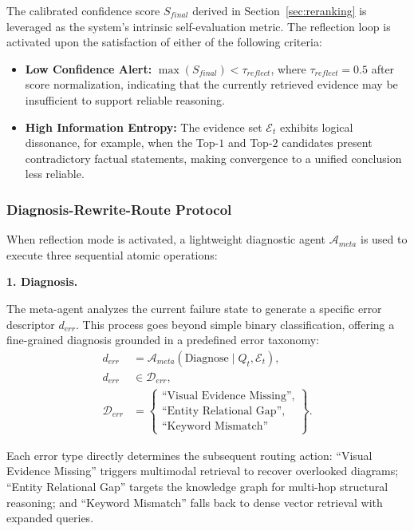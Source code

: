 \documentclass[a4paper, fleqn]{cas-dc}
\begin{document}
The calibrated confidence score $S_{final}$ derived in Section~\ref{sec:reranking} is leveraged as the system's intrinsic self-evaluation metric.
The reflection loop is activated upon the satisfaction of either of the following criteria:

\begin{itemize}
    \item \textbf{Low Confidence Alert:} $\max(S_{final}) < \tau_{reflect}$, where $\tau_{reflect} = 0.5$ after score normalization, indicating that the currently retrieved evidence may be insufficient to support reliable reasoning.
    \item \textbf{High Information Entropy:} The evidence set $\mathcal{E}_t$ exhibits logical dissonance, for example, when the Top-$1$ and Top-$2$ candidates present contradictory factual statements, making convergence to a unified conclusion less reliable.
\end{itemize}
\subsubsection{Diagnosis-Rewrite-Route Protocol}\label{sec:diagnose_rewrite_route}

When reflection mode is activated, a lightweight diagnostic agent $\mathcal{A}_{meta}$ is used to execute three sequential atomic operations:

\noindent\textbf{1. Diagnosis.}

The meta-agent analyzes the current failure state to generate a specific error descriptor $d_{err}$. This process goes beyond simple binary classification, offering a fine-grained diagnosis grounded in a predefined error taxonomy:
\begin{equation}
\begin{aligned}
    d_{err} &= \mathcal{A}_{meta}(\text{Diagnose} \mid Q_t, \mathcal{E}_t), \\
    d_{err} &\in \mathcal{D}_{err}, \\
    \mathcal{D}_{err} &=
    \left\{
    \begin{array}{l}
    \text{``Visual Evidence Missing''},\\
    \text{``Entity Relational Gap''},\\
    \text{``Keyword Mismatch''}
    \end{array}
    \right\}.
\end{aligned}
\label{eq:error_descriptor}
\end{equation}

Each error type directly determines the subsequent routing action: ``Visual Evidence Missing'' triggers multimodal retrieval to recover overlooked diagrams; ``Entity Relational Gap'' targets the knowledge graph for multi-hop structural reasoning; and ``Keyword Mismatch'' falls back to dense vector retrieval with expanded queries.
\end{document}
